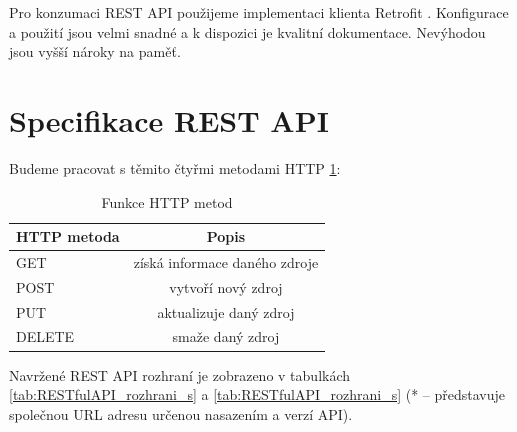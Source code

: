 \documentclass[thesis=B,czech]{FITthesis}[2012/06/26]
\begin{document}
Pro konzumaci REST API použijeme implementaci klienta Retrofit \cite{design_android_retrofit}. Konfigurace a použití jsou velmi snadné a k dispozici je kvalitní dokumentace. Nevýhodou jsou vyšší nároky na paměť\cite{design_android_retrofit_benefit}.  	

\section{Specifikace REST API}
\label{rest_api_design}

Budeme pracovat s těmito čtyřmi metodami HTTP \ref{tab:RESTfulAPI_definice}:

\begin{table}[!h]\centering
\caption{Funkce HTTP metod}\label{tab:RESTfulAPI_definice}
	\begin{tabular}{l c}
		\toprule
		\textbf{HTTP metoda} & \textbf{Popis} \\ \midrule \midrule
		GET & získá informace daného zdroje  \\ \midrule	
		POST & vytvoří nový zdroj\\ \midrule
		PUT & aktualizuje daný zdroj  \\ \midrule
		DELETE & smaže daný zdroj \\ \bottomrule
	\end{tabular}
\end{table}

Navržené REST API rozhraní je zobrazeno v tabulkách \ref{tab:RESTfulAPI_rozhrani_s} a \ref{tab:RESTfulAPI_rozhrani_s} (* -- představuje společnou URL adresu určenou nasazením a verzí API).
\end{document}
